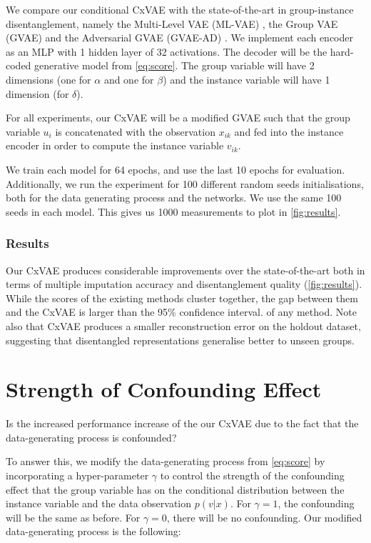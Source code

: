 \documentclass[nohyperref]{article}
\theoremstyle{plain}
\theoremstyle{definition}
\theoremstyle{remark}
\begin{document}
We compare our conditional CxVAE with the state-of-the-art in group-instance disentanglement, namely the Multi-Level VAE (ML-VAE) \citep{Bouchacourt2018MultiLevelVA}, the Group VAE (GVAE) \citep{Hosoya2019GroupbasedLO} and the Adversarial GVAE (GVAE-AD) \citep{Nmeth2020AdversarialDW}. We implement each encoder as an MLP with 1 hidden layer of 32 activations. The decoder will be the hard-coded generative model from \cref{eq:score}. The group variable will have 2 dimensions (one for $\alpha$ and one for $\beta$) and the instance variable will have 1 dimension (for $\delta$). 

For all experiments, our CxVAE will be a modified GVAE such that the group variable $u_i$ is concatenated with the observation $x_{ik}$ and fed into the instance encoder in order to compute the instance variable $v_{ik}$.

We train each model for 64 epochs, and use the last 10 epochs for evaluation. Additionally, we run the experiment for 100 different random seeds initialisations, both for the data generating process and the networks. We use the same 100 seeds in each model. This gives us 1000 measurements to plot in \cref{fig:results}.

\subsubsection{Results} 

Our CxVAE produces considerable improvements over the state-of-the-art both in terms of multiple imputation accuracy and disentanglement quality (\cref{fig:results}). While the scores of the existing methods cluster together, the gap between them and the CxVAE is larger than the 95\% confidence interval. of any method. Note also that CxVAE produces a smaller reconstruction error on the holdout dataset, suggesting that disentangled representations generalise better to unseen groups.

\section{Strength of Confounding Effect}
\label{xy}

Is the increased performance increase of the our CxVAE due to the fact that the data-generating process is confounded?

To answer this, we modify the data-generating process from \cref{eq:score} by incorporating a hyper-parameter $\gamma$ to control the strength of the confounding effect that the group variable has on the conditional distribution between the instance variable and the data observation $p(v|x)$. For $\gamma=1$, the confounding will be the same as before. For $\gamma=0$, there will be no confounding. Our modified data-generating process is the following:
\end{document}
